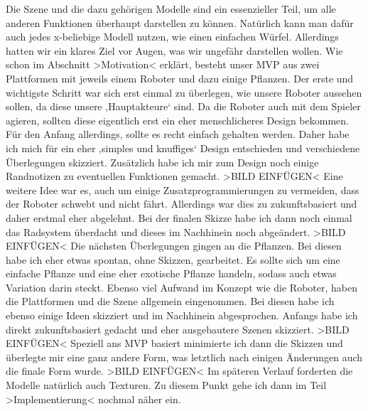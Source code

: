 Die Szene und die dazu gehörigen Modelle sind ein essenzieller Teil, um alle anderen Funktionen überhaupt darstellen zu können. Natürlich kann man dafür auch jedes x-beliebige Modell nutzen, wie einen einfachen Würfel. Allerdings hatten wir ein klares Ziel vor Augen, was wir ungefähr darstellen wollen. Wie schon im Abschnitt >Motivation< erklärt, besteht unser MVP aus zwei Plattformen mit jeweils einem Roboter und dazu einige Pflanzen.
Der erste und wichtigste Schritt war sich erst einmal zu überlegen, wie unsere Roboter aussehen sollen, da diese unsere ‚Hauptakteure‘ sind. Da die Roboter auch mit dem Spieler agieren, sollten diese eigentlich erst ein eher menschlicheres Design bekommen. Für den Anfang allerdings, sollte es recht einfach gehalten werden. Daher habe ich mich für ein eher ‚simples und knuffiges‘ Design entschieden und verschiedene Überlegungen skizziert. Zusätzlich habe ich mir zum Design noch einige Randnotizen zu eventuellen Funktionen gemacht. >BILD EINFÜGEN< Eine weitere Idee war es, auch um einige Zusatzprogrammierungen zu vermeiden, dass der Roboter schwebt und nicht fährt. Allerdings war dies zu zukunftsbasiert und daher erstmal eher abgelehnt. Bei der finalen Skizze habe ich dann noch einmal das Radsystem überdacht und dieses im Nachhinein noch abgeändert.  >BILD EINFÜGEN< 
Die nächsten Überlegungen gingen an die Pflanzen. Bei diesen habe ich eher etwas spontan, ohne Skizzen, gearbeitet. Es sollte sich um eine einfache Pflanze und eine eher exotische Pflanze handeln, sodass auch etwas Variation darin steckt.
Ebenso viel Aufwand im Konzept wie die Roboter, haben die Plattformen und die Szene allgemein eingenommen. Bei diesen habe ich ebenso einige Ideen skizziert und im Nachhinein abgesprochen. Anfangs habe ich direkt zukunftsbasiert gedacht und eher ausgebautere Szenen skizziert. >BILD EINFÜGEN< Speziell ans MVP basiert minimierte ich dann die Skizzen und überlegte mir eine ganz andere Form, was letztlich nach einigen Änderungen auch die finale Form wurde. >BILD EINFÜGEN<
Im späteren Verlauf forderten die Modelle natürlich auch Texturen. Zu diesem Punkt gehe ich dann im Teil >Implementierung< nochmal näher ein.

